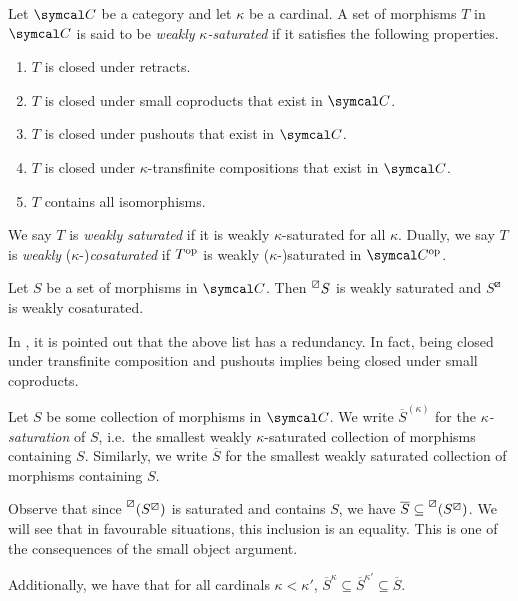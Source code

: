 \begin{definition}
	Let \(\calC\) be a category and let \(\kappa\) be a cardinal. A set of morphisms \(T\) in \(\calC\) is said to be \emph{weakly} \(\kappa\)\emph{-saturated} if it satisfies the following
	properties.
	\begin{enumerate}[label=(\arabic*)]
		\item \(T\) is closed under retracts.
		\item \(T\) is closed under small coproducts that exist in \(\calC\).
		\item \(T\) is closed under pushouts that exist in \(\calC\).
		\item \(T\) is closed under \(\kappa\)-transfinite compositions that exist in \(\calC\).
		\item \(T\) contains all isomorphisms.
	\end{enumerate}
	We say \(T\) is \emph{weakly saturated} if it is weakly \(\kappa\)-saturated for all \(\kappa\). Dually, we say \(T\) is \emph{weakly} (\(\kappa\)-)\emph{cosaturated} if \(T^{\mathrm{op}}\)
	is weakly (\(\kappa\)-)saturated in \(\calC^\op\).
\end{definition}
\begin{corollary}\label{corollary:llp-weakly-saturated}
	Let \(S\) be a set of morphisms in \(\calC\). Then \(\prescript{\boxslash}{}{S}\) is weakly saturated and \(S^\boxslash\) is weakly cosaturated.
\end{corollary}
\begin{remark}
	In \cite[Remark 2.1.3]{cisinski-book}, it is pointed out that the above list has a redundancy. In fact, being closed under transfinite composition and pushouts implies being
	closed under small coproducts.
\end{remark}

\begin{notation}
	Let \(S\) be some collection of morphisms in \(\calC\). We write \(\overline{S}^{(\kappa)}\) for the \(\kappa\)\emph{-saturation} of \(S\), i.e.\ the smallest
	weakly \(\kappa\)-saturated collection of morphisms containing \(S\). Similarly, we write \(\overline{S}\) for the smallest weakly saturated collection of morphisms containing \(S\).
\end{notation}
\begin{remark}\label{remark:saturation-inclusions}
	Observe that since \(\prescript{\boxslash}{}{(S^\boxslash)}\) is saturated and contains \(S\), we have \(\overline{S} \subseteq \prescript{\boxslash}{}{(S^\boxslash)}\). We will
	see that in favourable situations, this inclusion is an equality. This is one of the consequences of the small object argument.
	
	Additionally, we have that for all cardinals \(\kappa < \kappa'\), \(\overline{S}^{\kappa} \subseteq \overline{S}^{\kappa'} \subseteq \overline{S}\).
\end{remark}

